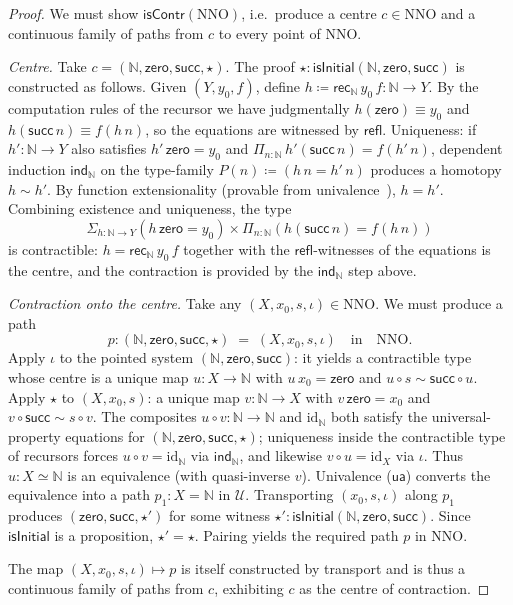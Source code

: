 \documentclass[12pt]{article}
\theoremstyle{definition}
\theoremstyle{remark}
\newcommand{\N}{\mathbb{N}}
\newcommand{\id}{\mathrm{id}}
\newcommand{\zero}{\mathsf{zero}}
\newcommand{\suc}{\mathsf{succ}}
\newcommand{\eqv}{\simeq}
\newcommand{\NNO}{\mathrm{NNO}}
\newcommand{\U}{\mathcal{U}}
\newcommand{\refl}{\mathsf{refl}}
\newcommand{\ua}{\mathsf{ua}}
\newcommand{\isContr}{\mathsf{isContr}}
\newcommand{\rec}{\mathsf{rec}}
\newcommand{\ind}{\mathsf{ind}}
\newcommand{\Sigmatype}{\Sigma}
\newcommand{\Pitype}{\Pi}
\begin{document}
\begin{proof}
We must show $\isContr(\NNO)$, i.e.\ produce a centre $c\in\NNO$ and a continuous family of paths from $c$ to every point of $\NNO$.

\emph{Centre.} Take $c=(\N,\zero,\suc,\star)$. The proof $\star\colon \mathsf{isInitial}(\N,\zero,\suc)$ is constructed as follows. Given $(Y,y_{0},f)$, define $h\coloneqq \rec_{\N}\,y_{0}\,f\colon \N\to Y$. By the computation rules of the recursor we have judgmentally $h(\zero)\equiv y_{0}$ and $h(\suc\,n)\equiv f(h\,n)$, so the equations are witnessed by $\refl$. Uniqueness: if $h'\colon \N\to Y$ also satisfies $h'\,\zero = y_{0}$ and $\Pitype_{n:\N}\,h'(\suc\,n)=f(h'\,n)$, dependent induction $\ind_{\N}$ on the type-family $P(n)\coloneqq (h\,n=h'\,n)$ produces a homotopy $h\sim h'$. By function extensionality (provable from univalence~\cite{HoTTBook}), $h=h'$. Combining existence and uniqueness, the type
\[
\Sigmatype_{h\colon \N\to Y}(h\,\zero=y_{0})\times\Pitype_{n:\N}(h(\suc\,n)=f(h\,n))
\]
is contractible: $h=\rec_{\N}\,y_{0}\,f$ together with the $\refl$-witnesses of the equations is the centre, and the contraction is provided by the $\ind_{\N}$ step above.

\emph{Contraction onto the centre.} Take any $(X,x_{0},s,\iota)\in\NNO$. We must produce a path
\[
p\colon (\N,\zero,\suc,\star) \;=\; (X,x_{0},s,\iota) \quad\text{in}\quad \NNO.
\]
Apply $\iota$ to the pointed system $(\N,\zero,\suc)$: it yields a contractible type whose centre is a unique map $u\colon X\to \N$ with $u\,x_{0}=\zero$ and $u\circ s\sim \suc\circ u$. Apply $\star$ to $(X,x_{0},s)$: a unique map $v\colon \N\to X$ with $v\,\zero=x_{0}$ and $v\circ \suc\sim s\circ v$. The composites $u\circ v\colon \N\to\N$ and $\id_{\N}$ both satisfy the universal-property equations for $(\N,\zero,\suc,\star)$; uniqueness inside the contractible type of recursors forces $u\circ v=\id_{\N}$ via $\ind_{\N}$, and likewise $v\circ u=\id_{X}$ via $\iota$. Thus $u\colon X\eqv\N$ is an equivalence (with quasi-inverse $v$). Univalence ($\ua$) converts the equivalence into a path $p_{1}\colon X = \N$ in $\U$. Transporting $(x_{0},s,\iota)$ along $p_{1}$ produces $(\zero,\suc,\star')$ for some witness $\star'\colon \mathsf{isInitial}(\N,\zero,\suc)$. Since $\mathsf{isInitial}$ is a proposition, $\star'=\star$. Pairing yields the required path $p$ in $\NNO$.

The map $(X,x_{0},s,\iota)\mapsto p$ is itself constructed by transport and is thus a continuous family of paths from $c$, exhibiting $c$ as the centre of contraction.
\end{proof}
\end{document}

